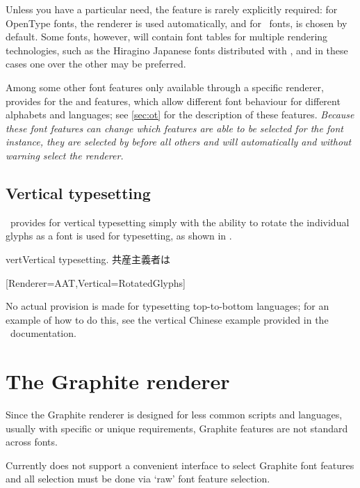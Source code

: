 \documentclass[a4paper]{l3doc}
\begin{document}
Unless you have a particular need, the  feature is rarely explicitly required: for OpenType
fonts, the  renderer is used automatically, and for \AAT\ fonts,
 is chosen by default. Some fonts, however, will contain font tables
for multiple rendering technologies, such as the Hiragino Japanese fonts
distributed with \MacOSX, and in these cases one over the other may be preferred.

Among some other font features only available through a specific renderer,
 provides for the  and  features, which allow
different font behaviour for different alphabets and languages; see \vref{sec:ot}
for the description of these features. {\em Because these font features can
change which features are able to be selected for the font instance, they are selected
by  before all others and will automatically and without warning
select the  renderer.}


\subsection{Vertical typesetting}

\XeTeX\ provides for vertical typesetting simply with the ability to rotate
the individual glyphs as a font is used for typesetting, as shown in
.

\begin{Xexample}[firstline=2]{vert}{Vertical typesetting.}
  \def\verttext{共産主義者は}
  \verttext

  [Renderer=AAT,Vertical=RotatedGlyphs]
  \rotatebox{-90}{\verttext}%
\end{Xexample}

No actual provision is made for typesetting top-to-bottom
languages; for an example of how to do this, see the vertical Chinese
example provided in the \XeTeX\ documentation.


\section{The Graphite renderer}
\label{sec:graphite-features}

Since the Graphite renderer is designed for less common scripts and languages, usually with
specific or unique requirements, Graphite features are not standard across fonts.

Currently  does not support a convenient interface to select Graphite font
features and all selection must be done via `raw' font feature selection.
\end{document}
